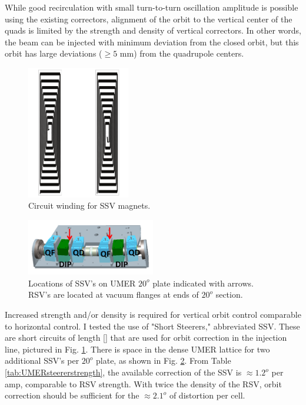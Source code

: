 
While good recirculation with small turn-to-turn oscillation amplitude is possible using the existing correctors, alignment of the orbit to the vertical center of the quads is limited by the strength and density of vertical correctors. In other words, the beam can be injected with minimum deviation from the closed orbit, but this orbit has large deviations ($\ge 5$ mm) from the quadrupole centers.  

\begin{figure} 
\includegraphics[width=0.4\textwidth]{4.figures/SSV/SSVdrawing.pdf}
\caption{Circuit winding for SSV magnets.}
\label{fig:SSVdrawing}
\end{figure}

\begin{figure}[htb]
\centering
\includegraphics[width=0.5\textwidth]{4.figures/SSV/SSVlocations.png}
\caption{Locations of SSV's on UMER $20^o$ plate indicated with arrows. RSV's are located at vacuum flanges at ends of $20^o$ section.}
\label{fig:SSVlocation}
\end{figure}

Increased strength and/or density is required for vertical orbit control comparable to horizontal control. I tested the use of "Short Steerers," abbreviated SSV. These are short circuits of length [] that are used for orbit correction in the injection line, pictured in Fig. \ref{fig:SSVdrawing}. There is space in the dense UMER lattice for two additional SSV's per $20^o$ plate, as shown in Fig. \ref{fig:SSVlocation}. From Table \ref{tab:UMERsteererstrength}, the available correction of the SSV is $\approx 1.2^o$ per amp, comparable to RSV strength. With twice the density of the RSV, orbit correction should be sufficient for the $\approx 2.1^o$ of distortion per cell.


